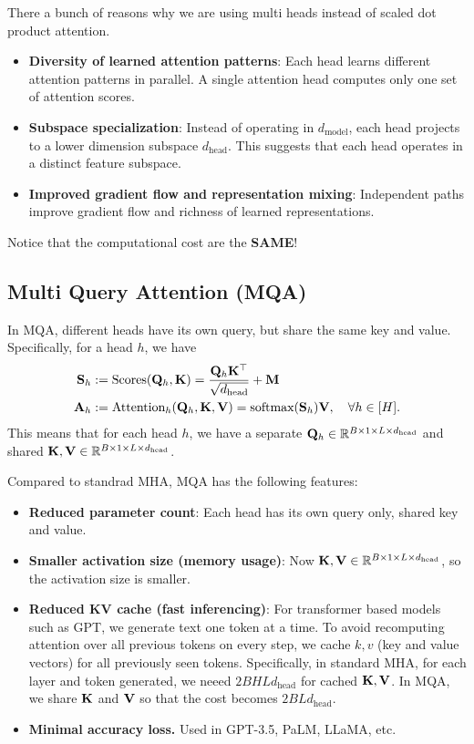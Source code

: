 \documentclass[11pt]{article}  %
\begin{document}
There a bunch of reasons why we are using multi heads instead of scaled dot product attention. 
\begin{itemize}
  \item \textbf{Diversity of learned attention patterns}: Each head learns different attention patterns in parallel. 
  A single attention head computes only one set of attention scores.

  \item \textbf{Subspace specialization}: Instead of operating in $d_{\text{model}}$, each head projects to a lower dimension subspace $d_{\text{head}}$.
  This suggests that each head operates in a distinct feature subspace.

  \item \textbf{Improved gradient flow and representation mixing}: Independent paths improve gradient flow and richness of learned representations.
\end{itemize}
Notice that the computational cost are the \textbf{SAME}!

\subsection{Multi Query Attention (MQA)}
In MQA, different heads have its own query, but share the same key and value.
Specifically, for a head $h$, we have 
\begin{align*}
  \mathbf{S}_h &:= \text{Scores}(\mathbf{Q}_h, \mathbf{K}) = \frac{\mathbf{Q}_h\mathbf{K}^{\top}}{\sqrt{d_{\text{head}}}} + \mathbf{M} \\
  \mathbf{A}_h &:= \text{Attention}_h (\mathbf{Q}_h, \mathbf{K}, \mathbf{V}) = \text{softmax}(\mathbf{S}_h)\mathbf{V}, \quad \forall h \in [H]. 
\end{align*}
This means that for each head $h$, we have a separate $\mathbf{Q}_h \in \mathbb{R}^{B \times 1 \times L \times d_{\text{head}}}$ and shared $\mathbf{K}, \mathbf{V} \in \mathbb{R}^{B \times 1 \times L \times d_{\text{head}}}$.

Compared to standrad MHA, MQA has the following features:
\begin{itemize}
  \item \textbf{Reduced parameter count}: Each head has its own query only, shared key and value.
  \item \textbf{Smaller activation size (memory usage)}: Now $\mathbf{K}, \mathbf{V} \in \mathbb{R}^{B \times 1 \times L \times d_{\text{head}}}$, so the activation size is smaller.
  \item \textbf{Reduced KV cache (fast inferencing)}: For transformer based models such as GPT, we generate text one token at a time. 
  To avoid recomputing attention over all previous tokens on every step, we cache $k, v$ (key and value vectors) for all previously seen tokens.
  Specifically, in standard MHA, for each layer and token generated, we neeed $2BHLd_{\text{head}}$ for cached $\mathbf{K}, \mathbf{V}$.
  In MQA, we share $\mathbf{K}$ and $\mathbf{V}$ so that the cost becomes $2BLd_{\text{head}}$.
  \item \textbf{Minimal accuracy loss.} Used in GPT-3.5, PaLM, LLaMA, etc.
\end{itemize}
\end{document}
